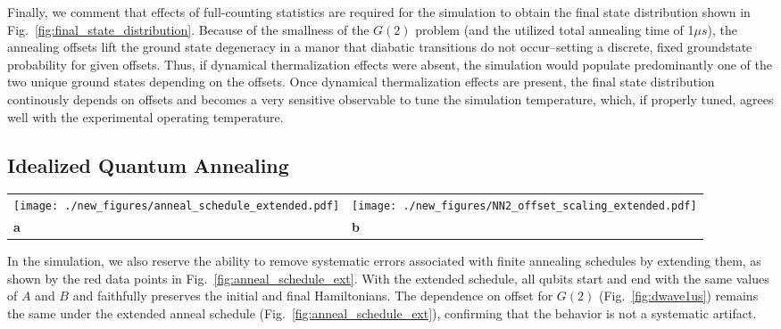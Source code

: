 \documentclass[prd,twocolumn,tightenlines,preprintnumbers,showpacs,superscriptaddress,notitlepage,nofootinbib,eqsecnum,floatfix,longbibliography,aps,10pt]{revtex4-2}
\begin{document}
Finally, we comment that effects of full-counting statistics are required for the simulation to obtain the final state distribution shown in Fig.~\ref{fig:final_state_distribution}.
Because of the smallness of the $G(2)$ problem (and the utilized total annealing time of 1$\mu s$), the annealing offsets lift the ground state degeneracy in a manor that diabatic transitions do not occur--setting a discrete, fixed groundstate probability for given offsets.
Thus, if dynamical thermalization effects were absent, the simulation would populate predominantly one of the two unique ground states depending on the offsets.
Once dynamical thermalization effects are present, the final state distribution  continously depends on offsets and becomes a very sensitive observable to tune the simulation temperature, which, if properly tuned, agrees well with the experimental operating temperature.


\subsection{Idealized Quantum Annealing}
\label{sec:discussion:idealqa}

\begin{figure*}
    \centering
	\begin{tabular}{p{}p{}}
	\texttt{[image: ./new\_figures/anneal\_schedule\_extended.pdf]}
    &
	\texttt{[image: ./new\_figures/NN2\_offset\_scaling\_extended.pdf]}\\
	\centering \textbf{a} & \centering \textbf{b}
	\end{tabular}
	\centering
	\caption{Extended annealing schedule and simulation result. \textbf{a)} The annealing time is increased by 10\% at both the start and end, and the initial values of $A(s)$ and $B(s)$ at non-zero offset are also not extrapolated in comparison to Fig.~\ref{fig:anneal_schedule}. Therefore, the initial and final Hamiltonian are no longer suffer systematic error at non-zero offset. \textbf{b)} The default (dashed yellow) result is one presented in Fig.~\ref{fig:dwave1us}. Results from extended schedules are presented shown with solid lines with full-counting statistics and amplitude damping (red), only full-counting-statistics (blue), and only amplitude damping (green).
    }
	\label{fig:anneal_schedule_ext}
\end{figure*}

In the simulation, we also reserve the ability to remove systematic errors associated with finite annealing schedules by extending them, as shown by the red data points in Fig.~\ref{fig:anneal_schedule_ext}. With the extended schedule, all qubits start and end with the same values of $A$ and $B$ and faithfully preserves the initial and final Hamiltonians. The dependence on offset for $G(2)$ (Fig.~\ref{fig:dwave1us}) remains the same under the extended anneal schedule (Fig.~\ref{fig:anneal_schedule_ext}), confirming that the behavior is not a systematic artifact.
\end{document}
